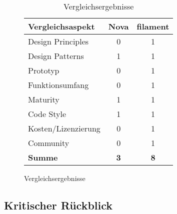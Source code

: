 \begin{figure}[h!]
    \begin{table}[]
        \centering
        \caption{Vergleichsergebnisse}
        \label{tab:vergleichsergebnisse}
        \begin{tabular}{|l|c|c|}
            \hline
            \textbf{Vergleichsaspekt} & \textbf{Nova} & \textbf{filament} \\ \hline
            Design Principles         & 0             & 1                 \\ \hline
            Design Patterns           & 1             & 1                 \\ \hline
            Prototyp                  & 0             & 1                 \\ \hline
            Funktionsumfang           & 0             & 1                 \\ \hline
            Maturity                  & 1             & 1                 \\ \hline
            Code Style                & 1             & 1                 \\ \hline
            Kosten/Lizenzierung       & 0             & 1                 \\ \hline
            Community                 & 0             & 1                 \\ \hline
            \textbf{Summe}            & \textbf{3}    & \textbf{8}        \\ \hline
        \end{tabular}
    \end{table}
\end{figure}

\subsection{Kritischer Rückblick}

